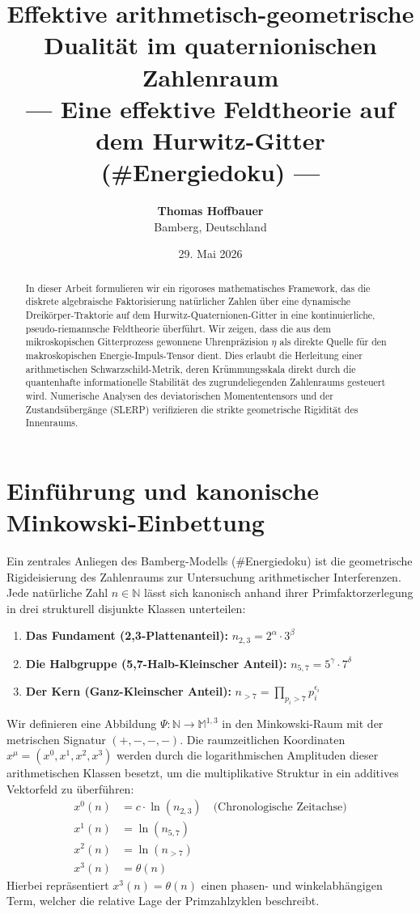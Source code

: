 \documentclass[11pt,a4paper,nofootinbib]{article}
\title{\textbf{Effektive arithmetisch-geometrische Dualität im quaternionischen Zahlenraum}\\
	\large --- Eine effektive Feldtheorie auf dem Hurwitz-Gitter (\#Energiedoku) ---}
\author{\textbf{Thomas Hoffbauer} \\
	\small Bamberg, Deutschland}
\date{\small 29. Mai 2026}
\begin{document}
	
	\maketitle
	
	\begin{abstract}
		In dieser Arbeit formulieren wir ein rigoroses mathematisches Framework, das die diskrete algebraische Faktorisierung natürlicher Zahlen über eine dynamische Dreikörper-Traktorie auf dem Hurwitz-Quaternionen-Gitter in eine kontinuierliche, pseudo-riemannsche Feldtheorie überführt. Wir zeigen, dass die aus dem mikroskopischen Gitterprozess gewonnene Uhrenpräzision $\eta$ als direkte Quelle für den makroskopischen Energie-Impuls-Tensor dient. Dies erlaubt die Herleitung einer arithmetischen Schwarzschild-Metrik, deren Krümmungsskala direkt durch die quantenhafte informationelle Stabilität des zugrundeliegenden Zahlenraums gesteuert wird. Numerische Analysen des deviatorischen Momententensors und der Zustandsübergänge (SLERP) verifizieren die strikte geometrische Rigidität des Innenraums.
	\end{abstract}
	
	\section{Einführung und kanonische Minkowski-Einbettung}
	Ein zentrales Anliegen des Bamberg-Modells (\#Energiedoku) ist die geometrische Rigideisierung des Zahlenraums zur Untersuchung arithmetischer Interferenzen. Jede natürliche Zahl $n \in \mathbb{N}$ lässt sich kanonisch anhand ihrer Primfaktorzerlegung in drei strukturell disjunkte Klassen unterteilen:
	\begin{enumerate}
		\item \textbf{Das Fundament (2,3-Plattenanteil):} $n_{2,3} = 2^{\alpha} \cdot 3^{\beta}$
		\item \textbf{Die Halbgruppe (5,7-Halb-Kleinscher Anteil):} $n_{5,7} = 5^{\gamma} \cdot 7^{\delta}$
		\item \textbf{Der Kern (Ganz-Kleinscher Anteil):} $n_{>7} = \prod_{p_i > 7} p_i^{\epsilon_i}$
	\end{enumerate}
	
	Wir definieren eine Abbildung $\Psi: \mathbb{N} \to \mathbb{M}^{1,3}$ in den Minkowski-Raum mit der metrischen Signatur $(+,-,-,-)$. Die raumzeitlichen Koordinaten $x^\mu = (x^0, x^1, x^2, x^3)$ werden durch die logarithmischen Amplituden dieser arithmetischen Klassen besetzt, um die multiplikative Struktur in ein additives Vektorfeld zu überführen:
	\begin{align}
		x^0(n) &= c \cdot \ln(n_{2,3}) \quad \text{(Chronologische Zeitachse)} \\
		x^1(n) &= \ln(n_{5,7}) \\
		x^2(n) &= \ln(n_{>7}) \\
		x^3(n) &= \theta(n)
	\end{align}
	Hierbei repräsentiert $x^3(n) = \theta(n)$ einen phasen- und winkelabhängigen Term, welcher die relative Lage der Primzahlzyklen beschreibt.
	
\end{document}

